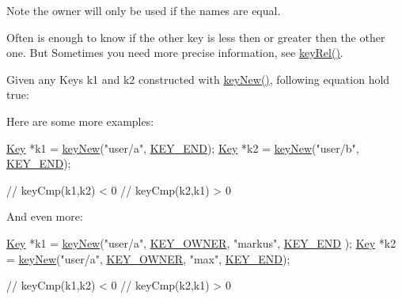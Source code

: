 \begin{DoxyNote}{Note}
the owner will only be used if the names are equal.
\end{DoxyNote}
Often is enough to know if the other key is less then or greater then the other one. But Sometimes you need more precise information, see \hyperlink{group__keytest_ga6bb0f95ac34ce9c42d61bb35a76139d0}{key\-Rel()}.

Given any Keys k1 and k2 constructed with \hyperlink{group__key_gad23c65b44bf48d773759e1f9a4d43b89}{key\-New()}, following equation hold true\-:


\begin{DoxyCodeInclude}
\end{DoxyCodeInclude}
 Here are some more examples\-: 
\begin{DoxyCode}
\hyperlink{classkdb_1_1Key_a5679f5cae63caddd64a60388b9cc77fa}{Key} *k1 = \hyperlink{group__key_gad23c65b44bf48d773759e1f9a4d43b89}{keyNew}(\textcolor{stringliteral}{"user/a"}, \hyperlink{group__key_gga91fb3178848bd682000958089abbaf40aa8adb6fcb92dec58fb19410eacfdd403}{KEY\_END});
\hyperlink{classkdb_1_1Key_a5679f5cae63caddd64a60388b9cc77fa}{Key} *k2 = \hyperlink{group__key_gad23c65b44bf48d773759e1f9a4d43b89}{keyNew}(\textcolor{stringliteral}{"user/b"}, \hyperlink{group__key_gga91fb3178848bd682000958089abbaf40aa8adb6fcb92dec58fb19410eacfdd403}{KEY\_END});

\textcolor{comment}{// keyCmp(k1,k2) < 0}
\textcolor{comment}{// keyCmp(k2,k1) > 0}
\end{DoxyCode}


And even more\-: 
\begin{DoxyCode}
\hyperlink{classkdb_1_1Key_a5679f5cae63caddd64a60388b9cc77fa}{Key} *k1 = \hyperlink{group__key_gad23c65b44bf48d773759e1f9a4d43b89}{keyNew}(\textcolor{stringliteral}{"user/a"}, \hyperlink{group__key_gga91fb3178848bd682000958089abbaf40a77ca60362fa8daca8d5347db4385068b}{KEY\_OWNER}, \textcolor{stringliteral}{"markus"}, \hyperlink{group__key_gga91fb3178848bd682000958089abbaf40aa8adb6fcb92dec58fb19410eacfdd403}{KEY\_END}
      );
\hyperlink{classkdb_1_1Key_a5679f5cae63caddd64a60388b9cc77fa}{Key} *k2 = \hyperlink{group__key_gad23c65b44bf48d773759e1f9a4d43b89}{keyNew}(\textcolor{stringliteral}{"user/a"}, \hyperlink{group__key_gga91fb3178848bd682000958089abbaf40a77ca60362fa8daca8d5347db4385068b}{KEY\_OWNER}, \textcolor{stringliteral}{"max"}, \hyperlink{group__key_gga91fb3178848bd682000958089abbaf40aa8adb6fcb92dec58fb19410eacfdd403}{KEY\_END});

\textcolor{comment}{// keyCmp(k1,k2) < 0}
\textcolor{comment}{// keyCmp(k2,k1) > 0}
\end{DoxyCode}


